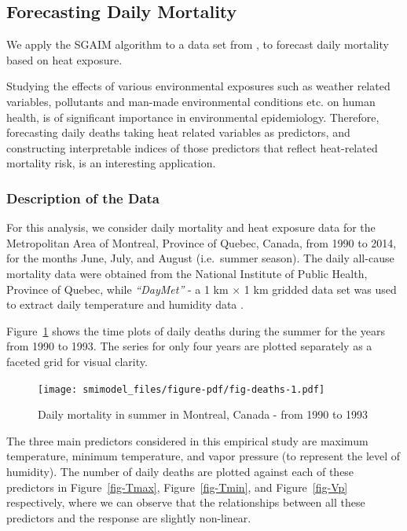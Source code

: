 \documentclass[11pt,a4paper,]{article}
\begin{document}
\hypertarget{forecasting-daily-mortality}{%
\subsection{Forecasting Daily
Mortality}\label{forecasting-daily-mortality}}

We apply the SGAIM algorithm to a data set from \textcite{Masselot2022},
to forecast daily mortality based on heat exposure.

Studying the effects of various environmental exposures such as weather
related variables, pollutants and man-made environmental conditions etc.
on human health, is of significant importance in environmental
epidemiology. Therefore, forecasting daily deaths taking heat related
variables as predictors, and constructing interpretable indices of those
predictors that reflect heat-related mortality risk, is an interesting
application.

\hypertarget{description-of-the-data}{%
\subsubsection{Description of the Data}\label{description-of-the-data}}

For this analysis, we consider daily mortality and heat exposure data
for the Metropolitan Area of Montreal, Province of Quebec, Canada, from
1990 to 2014, for the months June, July, and August (i.e.~summer
season). The daily all-cause mortality data were obtained from the
National Institute of Public Health, Province of Quebec, while
\emph{``DayMet''} - a 1 km × 1 km gridded data set
\autocite{Thornton2021} was used to extract daily temperature and
humidity data \autocite{Masselot2022}.

Figure~\ref{fig-deaths} shows the time plots of daily deaths during the
summer for the years from 1990 to 1993. The series for only four years
are plotted separately as a faceted grid for visual clarity.

\begin{figure}

{\centering \texttt{[image: smimodel\_files/figure-pdf/fig-deaths-1.pdf]}

}

\caption{\label{fig-deaths}Daily mortality in summer in Montreal, Canada
- from 1990 to 1993}

\end{figure}

The three main predictors considered in this empirical study are maximum
temperature, minimum temperature, and vapor pressure (to represent the
level of humidity). The number of daily deaths are plotted against each
of these predictors in Figure~\ref{fig-Tmax}, Figure~\ref{fig-Tmin}, and
Figure~\ref{fig-Vp} respectively, where we can observe that the
relationships between all these predictors and the response are slightly
non-linear.
\end{document}
